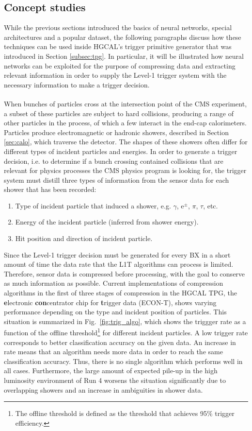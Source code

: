 \documentclass[../../main.tex]{subfiles}
\begin{document}
\subsection{Concept studies}\label{sec:concept}
While the previous sections introduced the basics of neural networks, special architectures and a popular dataset, the following paragraphs discuss how these techniques can be used inside HGCAL's trigger primitive generator that was introduced in Section \ref{subsec:tpg}. In particular, it will be illustrated how neural networks can be exploited for the purpose of compressing data and extracting relevant information in order to supply the Level-1 trigger system with the necessary information to make a trigger decision.\\
\\
When bunches of particles cross at the intersection point of the CMS experiment, a subset of these particles are subject to hard collisions, producing a range of other particles in the process, of which a few interact in the end-cap calorimeters. Particles produce electromagnetic or hadronic showers, described in Section \ref{sec:calo}, which traverse the detector. The shapes of these showers often differ for different types of incident particles and energies. In order to generate a trigger decision, i.e. to determine if a bunch crossing contained collisions that are relevant for physics processes the CMS physics program is looking for, the trigger system must distill three types of information from the sensor data for each shower that has been recorded:
\begin{enumerate}
	\item Type of incident particle that induced a shower, e.g. $\gamma$, e$^\pm$, $\pi$, $\tau$, etc.
	\item Energy of the incident particle (inferred from shower energy).
	\item Hit position and direction of incident particle.
\end{enumerate}
Since the Level-1 trigger decision must be generated for every BX in a short amount of time the data rate that the L1T algorithms can process is limited. Therefore, sensor data is compressed before processing, with the goal to conserve as much information as possible. Current implementations of compression algorithms in the first of three stages of compression in the HGCAL TPG, the \textbf{e}lectronic \textbf{con}centrator chip for \textbf{t}rigger data (ECON-T), shows varying performance depending on the type and incident position of particles. This situation is summarized in Fig.~\ref{fig:trig_algo}, which shows the triggger rate as a function of the offline threshold\footnote{The offline threshold is defined as the threshold that achieves 95\% trigger efficiency.} for different incident particles. A low trigger rate corresponds to better classification accuracy on the given data. An increase in rate means that an algorithm needs more data in order to reach the same classification accuracy. Thus, there is no single algorithm which performs well in all cases. Furthermore, the large amount of expected pile-up in the high luminosity environment of Run 4 worsens the situation significantly due to overlapping showers and an increase in ambiguities in shower data.\\
\end{document}
